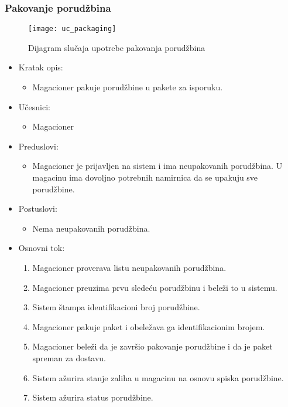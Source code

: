 
\subsubsection{Pakovanje porudžbina}
	\begin{figure}[H]
		\begin{center}
			\texttt{[image: uc\_packaging]}
			\caption{Dijagram slučaja upotrebe pakovanja porudžbina}		
		\end{center}
	\end{figure}
	\begin{itemize}
		\item{Kratak opis:} 
		\begin{itemize}
			\item{Magacioner pakuje porudžbine u pakete za isporuku.}
		\end{itemize}
		
		\item{Učesnici:} 
		\begin{itemize}
			\item{Magacioner}
		\end{itemize}		

		\item{Preduslovi:}
		\begin{itemize}
			\item{Magacioner je prijavljen na sistem i ima neupakovanih porudžbina. U magacinu ima dovoljno potrebnih namirnica da se upakuju sve porudžbine.}
		\end{itemize}
		
		\item{Postuslovi:}
		\begin{itemize}
			\item{Nema neupakovanih porudžbina.}
		\end{itemize}
		
		\item{Osnovni tok:}
		\begin{enumerate}
			\item{Magacioner proverava listu neupakovanih porudžbina.}
			\item{Magacioner preuzima prvu sledeću porudžbinu i beleži to u sistemu.}
			\item{Sistem štampa identifikacioni broj porudžbine.}
			\item{Magacioner pakuje paket i obeležava ga identifikacionim brojem.}
			\item{Magacioner beleži da je završio pakovanje porudžbine i da je paket spreman za dostavu.}
			\item{Sistem ažurira stanje zaliha u magacinu na osnovu spiska porudžbine.}
			\item{Sistem ažurira status porudžbine.}



\end{enumerate}
\end{itemize}
